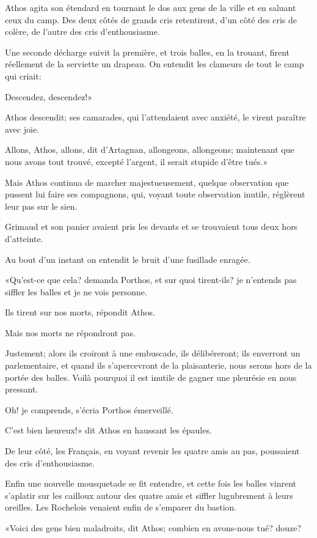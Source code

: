 Athos agita son étendard en tournant le dos aux gens de la ville et en saluant ceux du camp. Des deux côtés de grands cris retentirent, d'un côté des cris de colère, de l'autre des cris d'enthousiasme. 

Une seconde décharge suivit la première, et trois balles, en la trouant, firent réellement de la serviette un drapeau. On entendit les clameurs de tout le camp qui criait: 

\speak  Descendez, descendez!» 

Athos descendit; ses camarades, qui l'attendaient avec anxiété, le virent paraître avec joie. 

\speak  Allons, Athos, allons, dit d'Artagnan, allongeons, allongeons; maintenant que nous avons tout trouvé, excepté l'argent, il serait stupide d'être tués.» 

Mais Athos continua de marcher majestueusement, quelque observation que pussent lui faire ses compagnons, qui, voyant toute observation inutile, réglèrent leur pas sur le sien. 

Grimaud et son panier avaient pris les devants et se trouvaient tous deux hors d'atteinte. 

Au bout d'un instant on entendit le bruit d'une fusillade enragée. 

«Qu'est-ce que cela? demanda Porthos, et sur quoi tirent-ils? je n'entends pas siffler les balles et je ne vois personne. 

\speak  Ils tirent sur nos morts, répondit Athos. 

\speak  Mais nos morts ne répondront pas. 

\speak  Justement; alors ils croiront à une embuscade, ils délibéreront; ils enverront un parlementaire, et quand ils s'apercevront de la plaisanterie, nous serons hors de la portée des balles. Voilà pourquoi il est inutile de gagner une pleurésie en nous pressant. 

\speak  Oh! je comprends, s'écria Porthos émerveillé. 

\speak  C'est bien heureux!» dit Athos en haussant les épaules. 

De leur côté, les Français, en voyant revenir les quatre amis au pas, poussaient des cris d'enthousiasme. 

Enfin une nouvelle mousquetade se fit entendre, et cette fois les balles vinrent s'aplatir sur les cailloux autour des quatre amis et siffler lugubrement à leurs oreilles. Les Rochelois venaient enfin de s'emparer du bastion. 

«Voici des gens bien maladroits, dit Athos; combien en avons-nous tué? douze? 

